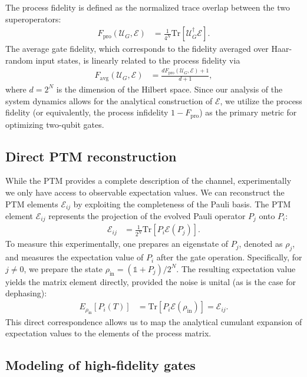\documentclass[%
 reprint,
superscriptaddress,
 amsmath,amssymb,
 aps,
pra,
]{revtex4-2}
\begin{document}
The process fidelity is defined as the normalized trace overlap between the two superoperators:
\begin{align}
    F_{\text{pro}}(\mathcal{U}_G, \mathcal{E}) &= \frac{1}{4^N} \text{Tr}\left[\mathcal{U}_G^\dagger \mathcal{E}\right].
\end{align}
The average gate fidelity, which corresponds to the fidelity averaged over Haar-random input states, is linearly related to the process fidelity via
\begin{align}
    F_{\text{avg}}(\mathcal{U}_G, \mathcal{E}) &= \frac{d F_{\text{pro}}(\mathcal{U}_G, \mathcal{E}) + 1}{d + 1},
\end{align}
where $d=2^N$ is the dimension of the Hilbert space. Since our analysis of the system dynamics allows for the analytical construction of $\mathcal{E}$, we utilize the process fidelity (or equivalently, the process infidelity $1-F_{\text{pro}}$) as the primary metric for optimizing two-qubit gates.

\subsection{Direct PTM reconstruction}
While the PTM provides a complete description of the channel, experimentally we only have access to observable expectation values. We can reconstruct the PTM elements $\mathcal{E}_{ij}$ by exploiting the completeness of the Pauli basis. The PTM element $\mathcal{E}_{ij}$ represents the projection of the evolved Pauli operator $P_j$ onto $P_i$:
\begin{align}
    \mathcal{E}_{ij} &= \frac{1}{2^N} \text{Tr}\left[P_i \mathcal{E}(P_j)\right].
\end{align}
To measure this experimentally, one prepares an eigenstate of $P_j$, denoted as $\rho_j$, and measures the expectation value of $P_i$ after the gate operation. Specifically, for $j \neq 0$, we prepare the state $\rho_{\text{in}} = (\mathbb{1} + P_j)/2^N$. The resulting expectation value yields the matrix element directly, provided the noise is unital (as is the case for dephasing):
\begin{align}
    E_{\rho_{\text{in}}}[P_i(T)] &= \text{Tr}[P_i \mathcal{E}(\rho_{\text{in}})] = \mathcal{E}_{ij}.
\end{align}
This direct correspondence allows us to map the analytical cumulant expansion of expectation values to the elements of the process matrix.

\subsection{Modeling of high-fidelity gates}
\label{sec::highFid}
\end{document}

